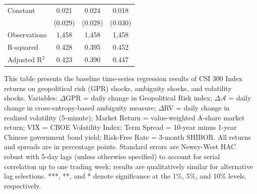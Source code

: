 \documentclass[preprint,12pt,authoryear]{elsarticle}
\begin{document}
\begin{table}[htbp]
\begin{threeparttable}
\begin{tabular*}{\textwidth}{@{\extracolsep{\fill}} lccc @{\extracolsep{\fill}}}
\midrule
Constant & 0.021 & 0.024 & 0.018 \\
& (0.029) & (0.028) & (0.030) \\
\midrule
Observations & 1,458 & 1,458 & 1,458 \\
R-squared & 0.428 & 0.395 & 0.452 \\
Adjusted R$^2$ & 0.423 & 0.390 & 0.447 \\
\bottomrule
\end{tabular*}
\begin{tablenotes}[flushleft]
\small
\item[] This table presents the baseline time-series regression results of CSI 300 Index returns on geopolitical risk (GPR) shocks, ambiguity shocks, and volatility shocks. Variables: $\Delta$GPR = daily change in Geopolitical Risk index; $\Delta \mathcal{A}$ = daily change in cross-entropy-based ambiguity measure; $\Delta$RV = daily change in realized volatility (5-minute); Market Return = value-weighted A-share market return; VIX = CBOE Volatility Index; Term Spread = 10-year minus 1-year Chinese government bond yield; Risk-Free Rate = 3-month SHIBOR. All returns and spreads are in percentage points. Standard errors are Newey-West HAC robust with 5-day lags (unless otherwise specified) to account for serial correlation up to one trading week; results are qualitatively similar for alternative lag selections. ***, **, and * denote significance at the 1\%, 5\%, and 10\% levels, respectively.
\end{tablenotes}
\end{threeparttable}
\end{table}
\end{document}
